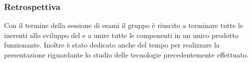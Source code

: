 \subsubsection{Retrospettiva}
\label{sec:sprint7_retrospettiva}
Con il termine della sessione di esami il gruppo è riuscito a terminare tutte le  inerenti allo sviluppo del  e a unire tutte le componenti in un unico prodotto funzionante.
Inoltre è stato dedicato anche del tempo per realizzare la presentazione riguardante lo studio delle tecnologie precedentemente effettuato.